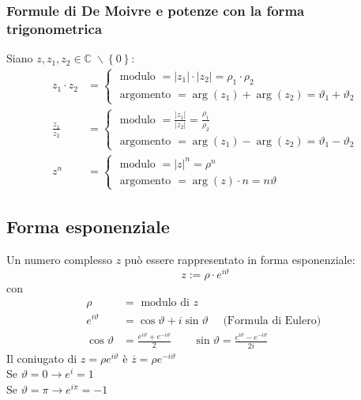\documentclass[a4paper]{article}
\begin{document}
\subsubsection*{Formule di De Moivre e potenze con la forma trigonometrica}
Siano \(z, z_1, z_2 \in \mathbb{C} \; \backslash \left\{ 0 \right\}\):
\begin{align*}
	z_1 \cdot z_2 &= 
	\begin{cases}
		\text{ modulo } = \left| z_1 \right| \cdot \left| z_2 \right| = \rho_1 \cdot \rho_2 \\
		\text{ argomento } = \arg(z_1) + \arg(z_2) = \vartheta_1 + \vartheta_2
	\end{cases} \\
	\frac{z_1}{z_2} &= 
	\begin{cases}
		\displaystyle \text{ modulo } = \frac{\left| z_1 \right|}{\left| z_2 \right|} = \frac{\rho_1}{\rho_2}\\
		\text{ argomento } = \arg(z_1) - \arg(z_2) = \vartheta_1 - \vartheta_2
	\end{cases} \\
	z ^ n &= 
	\begin{cases}
		\text{ modulo } = \left| z \right| ^ n = \rho ^ n \\
		\text{ argomento } = \arg(z) \cdot n = n \vartheta
	\end{cases}
\end{align*}

\newpage


\subsection{Forma esponenziale}
Un numero complesso \(z\) può essere rappresentato in forma esponenziale:
\[z := \rho \cdot e ^ {i \vartheta}\]
con
\begin{align*}
	\rho &= \text{ modulo di } z\\
	e^{i\vartheta} &= \cos \vartheta + i \sin \vartheta \quad \text{ (Formula di Eulero) } \\
	\cos \vartheta &= \frac{e ^ {i \vartheta} + e ^ {-i \vartheta}}{2} \qquad \sin \vartheta = \frac{e ^ {i \vartheta} - e ^ {-i \vartheta}}{2i}
\end{align*}
Il coniugato di  \(z = \rho e ^ {i \vartheta}\) è \(\overline{z} = \rho e ^ {-i \vartheta}\) \\
Se \(\vartheta = 0 \to e ^ i = 1\) \\
Se \(\vartheta = \pi \to e ^ {i\pi} = -1\)
\end{document}
